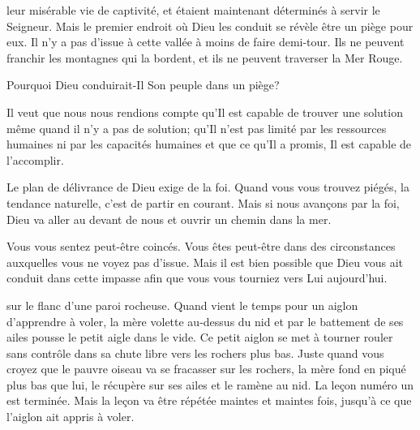  leur misérable vie de captivité,
 et étaient maintenant déterminés à servir le Seigneur.
 Mais le premier endroit où Dieu les conduit se révèle être un piège pour eux.
 Il n'y a pas d'issue à cette vallée à moins de faire demi-tour.
 Ils ne peuvent franchir les montagnes qui la bordent,
 et ils ne peuvent traverser la Mer Rouge.

Pourquoi Dieu conduirait-Il Son peuple dans un piège?


Il veut que nous nous rendions compte qu'Il est capable de trouver une solution
 même quand il n'y a pas de solution;
 qu'Il n'est pas limité par les ressources humaines
 ni par les capacités humaines et que ce qu'Il a promis,
 Il est capable de l'accomplir.

Le plan de délivrance de Dieu exige de la foi.
 Quand vous vous trouvez piégés, la tendance naturelle,
 c'est de partir en courant.
 Mais si nous avançons par la foi,
 Dieu va aller au devant de nous et ouvrir un chemin dans la mer.

Vous vous sentez peut-être coincés.
 Vous êtes peut-être dans des circonstances
 auxquelles vous ne voyez pas d'issue.
 Mais il est bien possible que Dieu vous ait conduit dans cette impasse
 afin que vous vous tourniez vers Lui aujourd'hui. 

\dvrule






 sur le flanc d'une paroi rocheuse.
 Quand vient le temps pour un aiglon d'apprendre à voler,
 la mère volette au-dessus du nid et par le battement de ses ailes
 pousse le petit aigle dans le vide.
 Ce petit aiglon se met à tourner rouler sans contrôle
 dans sa chute libre vers les rochers plus bas.
 Juste quand vous croyez que le pauvre oiseau va se fracasser sur les rochers,
 la mère fond en piqué plus bas que lui, le récupère sur ses ailes
 et le ramène au nid.
 La leçon numéro un est terminée.
 Mais la leçon va être répétée maintes et maintes fois,
 jusqu'à ce que l'aiglon ait appris à voler.

